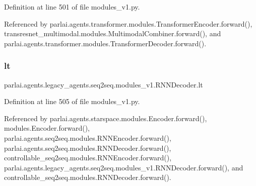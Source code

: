 Definition at line 501 of file modules\+\_\+v1.\+py.



Referenced by parlai.\+agents.\+transformer.\+modules.\+Transformer\+Encoder.\+forward(), transresnet\+\_\+multimodal.\+modules.\+Multimodal\+Combiner.\+forward(), and parlai.\+agents.\+transformer.\+modules.\+Transformer\+Decoder.\+forward().

\mbox{\label{classparlai_1_1agents_1_1legacy__agents_1_1seq2seq_1_1modules__v1_1_1RNNDecoder_a6780484ed7624987b046a01952e48b4a}} 
\subsubsection{\texorpdfstring{lt}{lt}}
{\footnotesize\ttfamily parlai.\+agents.\+legacy\+\_\+agents.\+seq2seq.\+modules\+\_\+v1.\+R\+N\+N\+Decoder.\+lt}



Definition at line 505 of file modules\+\_\+v1.\+py.



Referenced by parlai.\+agents.\+starspace.\+modules.\+Encoder.\+forward(), modules.\+Encoder.\+forward(), parlai.\+agents.\+seq2seq.\+modules.\+R\+N\+N\+Encoder.\+forward(), parlai.\+agents.\+seq2seq.\+modules.\+R\+N\+N\+Decoder.\+forward(), controllable\+\_\+seq2seq.\+modules.\+R\+N\+N\+Encoder.\+forward(), parlai.\+agents.\+legacy\+\_\+agents.\+seq2seq.\+modules\+\_\+v1.\+R\+N\+N\+Decoder.\+forward(), and controllable\+\_\+seq2seq.\+modules.\+R\+N\+N\+Decoder.\+forward().

\mbox{\label{classparlai_1_1agents_1_1legacy__agents_1_1seq2seq_1_1modules__v1_1_1RNNDecoder_adc1ecb61f30e70d211f0d53adb399fd6}} 
